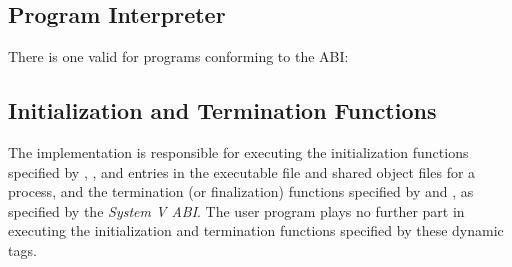 \subsection{Program Interpreter}

There is one valid  for
programs conforming to the \xARCH ABI:

\bigskip
{}

\subsection{Initialization and Termination Functions}

The implementation is responsible for executing the initialization
functions specified by , ,
and  entries in the executable file and
shared object files for a process, and the termination (or
finalization) functions specified by  and
, as specified by the \textit{System V ABI}.
The user program plays no further part in executing the initialization
and termination functions specified by these dynamic tags.


